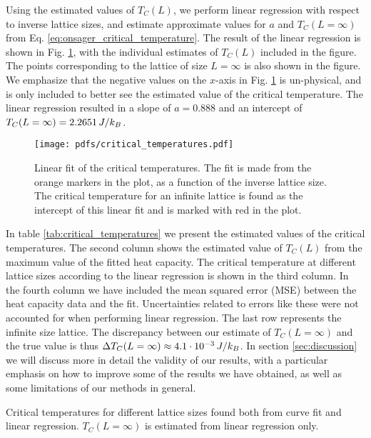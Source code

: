 Using the estimated values of $T_C(L)$, we perform linear regression with respect to inverse lattice sizes, and estimate approximate values for $a$ and $T_C(L=\infty)$ from Eq. \eqref{eq:onsager_critical_temperature}. The result of the linear regression is shown in Fig. \ref{fig:critical_temperatures}, with the individual estimates of $T_C(L)$ included in the figure. The points corresponding to the lattice of size $L=\infty$ is also shown in the figure. We emphasize that the negative values on the $x$-axis in Fig. \ref{fig:critical_temperatures} is un-physical, and is only included to better see the estimated value of the critical temperature. The linear regression resulted in a slope of $a=0.888$ and an intercept of $T_C(L=\infty)=2.2651\,J/k_B$.     
\begin{figure}[!ht]
    \texttt{[image: pdfs/critical\_temperatures.pdf]} 
    \caption{Linear fit of the critical temperatures. The fit is made from the orange markers in the plot, as a function of the inverse lattice size. The critical temperature for an infinite lattice is found as the intercept of this linear fit and is marked with red in the plot. }
    \label{fig:critical_temperatures}
\end{figure} 

In table \ref{tab:critical_temperatures} we present the estimated values of the critical temperatures. The second column shows the estimated value of $T_C(L)$ from the maximum value of the fitted heat capacity. The critical temperature at different lattice sizes according to the linear regression is shown in the third column. In the fourth column we have included the mean squared error (MSE) between the heat capacity data and the fit. Uncertainties related to errors like these were not accounted for when performing linear regression. The last row represents the infinite size lattice. The discrepancy between our estimate of $T_C(L=\infty)$ and the true value is thus $\Delta T_C(L=\infty)\approx4.1\cdot10^{-3}\,J/k_B$. In section \ref{sec:discussion} we will discuss more in detail the validity of our results, with a particular emphasis on how to improve some of the results we have obtained, as well as some limitations of our methods in general.    
\begin{table}[!ht]
    
    \caption{Critical temperatures for different lattice sizes found both from curve fit and linear regression. $T_C(L=\infty)$ is estimated from linear regression only.}
    \label{tab:critical_temperatures}
\end{table}

